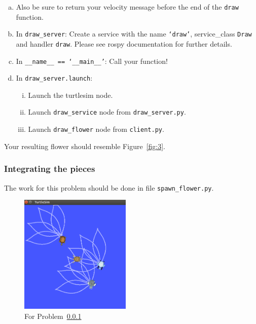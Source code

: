\begin{enumerate}[(a)]
  \item Also be sure to return your velocity message before the end of the \texttt{draw} function.
  \item In \texttt{draw\_server}: Create a service with the name \texttt{`draw'}, service\_class
  \texttt{Draw} and handler \texttt{draw}. Please see rospy documentation for further details.
  \item In \texttt{\_\_name\_\_ == `\_\_main\_\_'}: Call your function!
  \item In \texttt{draw\_server.launch}:
  \begin{enumerate}[i.]
    \item Launch the turtlesim node.
    \item Launch \texttt{draw\_service} node from \texttt{draw\_server.py}.
    \item  Launch \texttt{draw\_flower} node from \texttt{client.py}.
  \end{enumerate}

\end{enumerate}
Your resulting flower should resemble Figure~\ref{fig:3}.

\subsubsection{Integrating the pieces}\label{p:service2}

The work for this problem should be done in file \texttt{spawn\_flower.py}. 

\begin{figure}[h]
  \centering
  \includegraphics[width=150pt]{figures/p1/problem4b_3turts.png}
  \caption{For Problem~\ref{p:service2}}\label{fig:4}
\end{figure}

